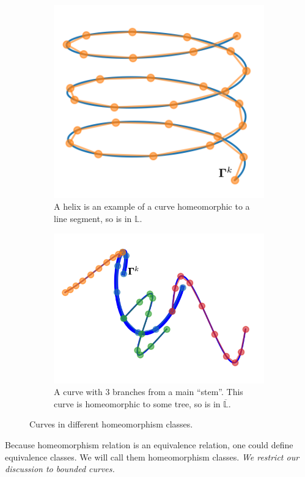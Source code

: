 \documentclass[../dissertation.tex]{subfiles}
\begin{document}
\begin{figure}[tpb]
    \centering
    \begin{subfigure}[b]{0.4\textwidth}
        \centering
        \includegraphics[width=\textwidth]{sections/otherHomeomorphismImgs/linesegment}
        \caption{A helix is an example of a curve homeomorphic to a line segment, so is in $\mathbb{L}$.}
        \label{fig: Line Segment Homeomorphism Class}
    \end{subfigure}
    \hspace{1cm}
    \begin{subfigure}[b]{0.4\textwidth}
        \centering
        \includegraphics[width=\textwidth]{sections/otherHomeomorphismImgs/branch}
        \caption{A curve with 3 branches from a main ``stem''. This curve is homeomorphic to some tree, so is in $\overline{\mathbb{L}}$.}
        \label{fig: Bus Network}
    \end{subfigure}
    \caption{Curves in different homeomorphism classes.}
\end{figure}
Because homeomorphism relation is an equivalence relation, one could define equivalence classes.
We will call them homeomorphism classes.
\textit{We restrict our discussion to bounded curves.}
\end{document}
